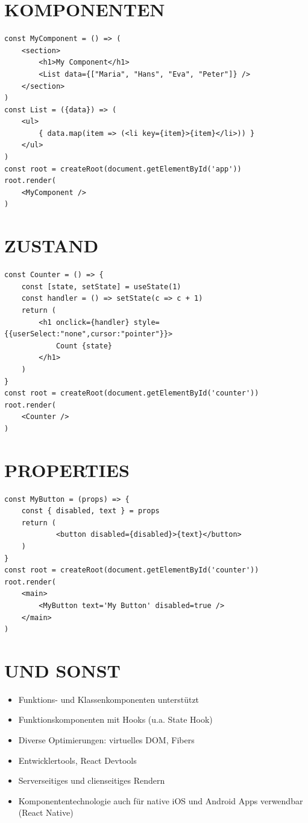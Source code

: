 \documentclass[10pt]{article}
\begin{document}
\section*{KOMPONENTEN}
\begin{verbatim}
const MyComponent = () => (
    <section>
        <h1>My Component</h1>
        <List data={["Maria", "Hans", "Eva", "Peter"]} />
    </section>
)
const List = ({data}) => (
    <ul>
        { data.map(item => (<li key={item}>{item}</li>)) }
    </ul>
)
const root = createRoot(document.getElementById('app'))
root.render(
    <MyComponent />
)
\end{verbatim}

\section*{ZUSTAND}
\begin{verbatim}
const Counter = () => {
    const [state, setState] = useState(1)
    const handler = () => setState(c => c + 1)
    return (
        <h1 onclick={handler} style={{userSelect:"none",cursor:"pointer"}}>
            Count {state}
        </h1>
    )
}
const root = createRoot(document.getElementById('counter'))
root.render(
    <Counter />
)
\end{verbatim}

\section*{PROPERTIES}
\begin{verbatim}
const MyButton = (props) => {
    const { disabled, text } = props
    return (
            <button disabled={disabled}>{text}</button>
    )
}
const root = createRoot(document.getElementById('counter'))
root.render(
    <main>
        <MyButton text='My Button' disabled=true />
    </main>
)
\end{verbatim}

\section*{UND SONST}
\begin{itemize}
  \item Funktions- und Klassenkomponenten unterstützt
  \item Funktionskomponenten mit Hooks (u.a. State Hook)
  \item Diverse Optimierungen: virtuelles DOM, Fibers
  \item Entwicklertools, React Devtools
  \item Serverseitiges und clienseitiges Rendern
  \item Komponententechnologie auch für native iOS und Android Apps verwendbar (React Native)
\end{itemize}
\end{document}
